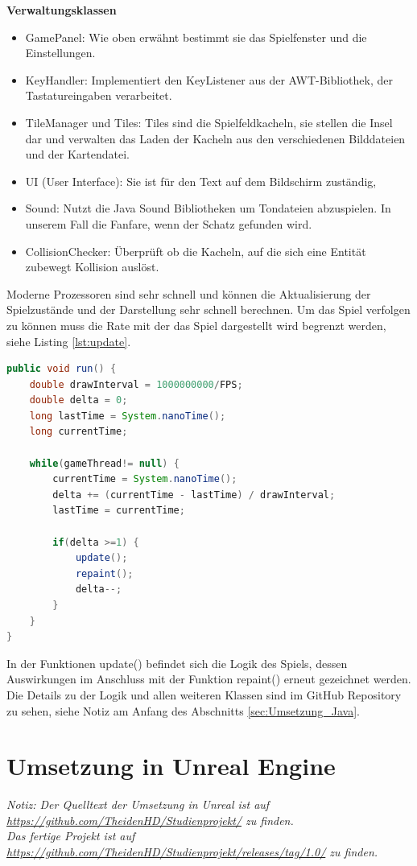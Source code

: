 \documentclass[
	12pt, %
	a4paper,
	listof=totoc, %
	bibliography=totoc, %
	numbers=noenddot, %
	ngerman, %
	headsepline, %
	oneside %
	]{scrbook} %
\begin{document}
\textbf{Verwaltungsklassen}
\begin{itemize}\vspace{-1em}
\setlength{\itemsep}{-1em}
	\item GamePanel: Wie oben erwähnt bestimmt sie das Spielfenster und die Einstellungen.
	\item KeyHandler: Implementiert den KeyListener aus der AWT-Bibliothek, der Tastatureingaben verarbeitet.
	\item TileManager und Tiles: Tiles sind die Spielfeldkacheln, sie stellen die Insel dar und verwalten das Laden der Kacheln aus den verschiedenen Bilddateien und der Kartendatei.
	\item UI (User Interface): Sie ist für den Text auf dem Bildschirm zuständig,
	\item Sound: Nutzt die Java Sound Bibliotheken um Tondateien abzuspielen. In unserem Fall die Fanfare, wenn der Schatz gefunden wird.
	\item CollisionChecker: Überprüft ob die Kacheln, auf die sich eine Entität zubewegt Kollision auslöst.
\end{itemize}

Moderne Prozessoren sind sehr schnell und können die Aktualisierung der Spielzustände und der Darstellung sehr schnell berechnen. Um das Spiel verfolgen zu können muss die Rate mit der das Spiel dargestellt wird begrenzt werden, siehe Listing \ref{lst:update}.

\begin{lstlisting}[language=Java, caption=Beschränkung der Aktualisierungen, label={lst:update}]
public void run() {
	double drawInterval = 1000000000/FPS;
	double delta = 0;
	long lastTime = System.nanoTime();
	long currentTime;
	
	while(gameThread!= null) {
		currentTime = System.nanoTime();
		delta += (currentTime - lastTime) / drawInterval;
		lastTime = currentTime;
		
		if(delta >=1) {
			update();
			repaint();
			delta--;
		}
	}
}
\end{lstlisting}

In der Funktionen update() befindet sich die Logik des Spiels, dessen Auswirkungen im Anschluss mit der Funktion repaint() erneut gezeichnet werden.  
Die Details zu der Logik und allen weiteren Klassen sind im GitHub Repository zu sehen, siehe Notiz am Anfang des Abschnitts \ref{sec:Umsetzung_Java}.


\section{Umsetzung in Unreal Engine}
\emph{Notiz: Der Quelltext der Umsetzung in Unreal ist auf \url{https://github.com/TheidenHD/Studienprojekt/} zu finden. \\
Das fertige Projekt ist auf \url{https://github.com/TheidenHD/Studienprojekt/releases/tag/1.0/} zu finden.}\\
\end{document}
